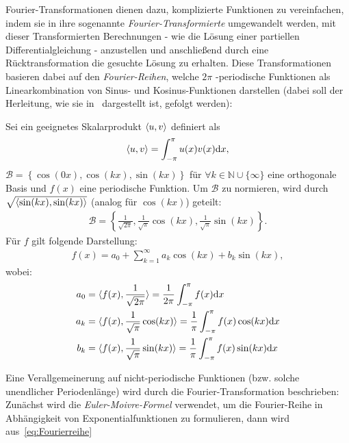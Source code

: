 Fourier-Transformationen dienen dazu, komplizierte Funktionen zu vereinfachen, indem sie in ihre sogenannte \emph{Fourier-Transformierte} umgewandelt werden, mit dieser Transformierten Berechnungen - wie die Lösung einer partiellen Differentialgleichung - anzustellen und anschließend durch eine Rücktransformation die gesuchte Lösung zu erhalten. Diese Transformationen basieren dabei auf den \emph{Fourier-Reihen}, welche $2\pi$ -periodische Funktionen als Linearkombination von Sinus- und Kosinus-Funktionen darstellen (dabei soll der Herleitung, wie sie in~\cite[S. 482 ff.]{engel_taylorentwicklung_2020} dargestellt ist, gefolgt werden):
\begin{Definitionbox}[]
    Sei ein geeignetes Skalarprodukt $\braket{u,v}$ definiert als
    \begin{align*}
        \braket{u,v}=\int_{-\pi}^{\pi}{u(x)v(x)\text{d} x},
    \end{align*}
    $\mathcal{B}=\left\{\cos(0x),\cos(kx),\sin(kx)\right\}$ für $\forall k\in \mathbb{N}\cup \{\infty \}$ eine orthogonale Basis und $f(x)$ eine periodische Funktion. Um $\mathcal{B}$ zu normieren, wird durch $\sqrt{\braket{\sin(kx),\sin(kx)}}$ (analog für $\cos(kx)$) geteilt:
    \begin{align*}
        \mathcal{B}= \left\{ \frac{1}{\sqrt{2\pi}}, \frac{1}{\sqrt{\pi}}\cos(kx),\frac{1}{\sqrt{\pi}}\sin(kx)\right\}.
    \end{align*}
    Für $f$ gilt folgende Darstellung:
    \begin{align}
    \label{eq:Fourierreihe}
        f(x) = a_0 + \sum_{k=1}^{\infty}{a_k \cos(kx)+b_k \sin(kx)},
    \end{align}
    wobei:
    \begin{align*}
        a_0 &= \braket{f(x),\frac{1}{\sqrt{2\pi}}} = \frac{1}{2\pi}\int_{-\pi}^{\pi}{f(x)\text{d} x} \\
        a_k &= \braket{f(x),\frac{1}{\sqrt{\pi}}\cos(kx)}=\frac{1}{\pi}\int_{-\pi}^{\pi}{f(x)\cos(kx)\text{d} x} \\
        b_k &= \braket{f(x),\frac{1}{\sqrt{\pi}}\sin(kx)}=\frac{1}{\pi}\int_{-\pi}^{\pi}{f(x)\sin(kx)\text{d} x} \\
    \end{align*}
\end{Definitionbox}
Eine Verallgemeinerung auf nicht-periodische Funktionen (bzw. solche unendlicher Periodenlänge) wird durch die Fourier-Transformation beschrieben:
Zunächst wird die \emph{Euler-Moivre-Formel} verwendet, um die Fourier-Reihe in Abhängigkeit von Exponentialfunktionen zu formulieren, dann wird aus~\eqref{eq:Fourierreihe}
